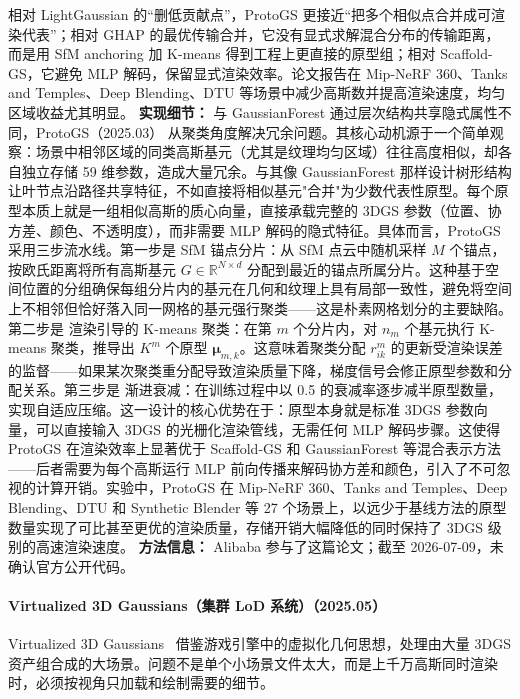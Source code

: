 相对 LightGaussian 的“删低贡献点”，ProtoGS 更接近“把多个相似点合并成可渲染代表”；相对 GHAP 的最优传输合并，它没有显式求解混合分布的传输距离，而是用 SfM anchoring 加 K-means 得到工程上更直接的原型组；相对 Scaffold-GS，它避免 MLP 解码，保留显式渲染效率。论文报告在 Mip-NeRF 360、Tanks and Temples、Deep Blending、DTU 等场景中减少高斯数并提高渲染速度，均匀区域收益尤其明显。
\textbf{实现细节：} 与 GaussianForest 通过层次结构共享隐式属性不同，ProtoGS（2025.03） 从聚类角度解决冗余问题。其核心动机源于一个简单观察：场景中相邻区域的同类高斯基元（尤其是纹理均匀区域）往往高度相似，却各自独立存储 59 维参数，造成大量冗余。与其像 GaussianForest 那样设计树形结构让叶节点沿路径共享特征，不如直接将相似基元"合并"为少数代表性原型。每个原型本质上就是一组相似高斯的质心向量，直接承载完整的 3DGS 参数（位置、协方差、颜色、不透明度），而非需要 MLP 解码的隐式特征。具体而言，ProtoGS 采用三步流水线。第一步是 SfM 锚点分片：从 SfM 点云中随机采样 $M$ 个锚点，按欧氏距离将所有高斯基元 $G \in \mathbb{R}^{N \times d}$ 分配到最近的锚点所属分片。这种基于空间位置的分组确保每组分片内的基元在几何和纹理上具有局部一致性，避免将空间上不相邻但恰好落入同一网格的基元强行聚类——这是朴素网格划分的主要缺陷。第二步是 渲染引导的 K-means 聚类：在第 $m$ 个分片内，对 $n_m$ 个基元执行 K-means 聚类，推导出 $K^m$ 个原型 $\bm{\mu}_{m,k}$。这意味着聚类分配 $r_{ik}^m$ 的更新受渲染误差的监督——如果某次聚类重分配导致渲染质量下降，梯度信号会修正原型参数和分配关系。第三步是 渐进衰减：在训练过程中以 0.5 的衰减率逐步减半原型数量，实现自适应压缩。这一设计的核心优势在于：原型本身就是标准 3DGS 参数向量，可以直接输入 3DGS 的光栅化渲染管线，无需任何 MLP 解码步骤。这使得 ProtoGS 在渲染效率上显著优于 Scaffold-GS 和 GaussianForest 等混合表示方法——后者需要为每个高斯运行 MLP 前向传播来解码协方差和颜色，引入了不可忽视的计算开销。实验中，ProtoGS 在 Mip-NeRF 360、Tanks and Temples、Deep Blending、DTU 和 Synthetic Blender 等 27 个场景上，以远少于基线方法的原型数量实现了可比甚至更优的渲染质量，存储开销大幅降低的同时保持了 3DGS 级别的高速渲染速度。
\textbf{方法信息：} Alibaba 参与了这篇论文；截至 2026-07-09，未确认官方公开代码。



\paragraph{Virtualized 3D Gaussians（集群 LoD 系统）（2025.05）}
Virtualized 3D Gaussians~\cite{2505_06523} 借鉴游戏引擎中的虚拟化几何思想，处理由大量 3DGS 资产组合成的大场景。问题不是单个小场景文件太大，而是上千万高斯同时渲染时，必须按视角只加载和绘制需要的细节。

